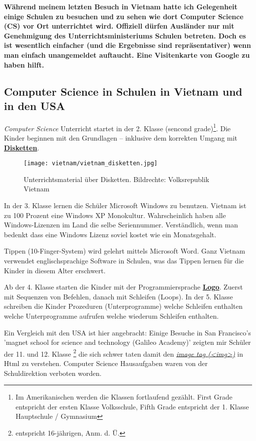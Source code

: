 \documentclass[10pt,a4paper,ngerman,twoside]{article} %
\begin{document}
\textbf{Während meinem letzten Besuch in Vietnam hatte ich Gelegenheit einige Schulen zu besuchen und zu sehen wie dort Computer Science (CS) vor Ort unterrichtet wird. Offiziell dürfen Ausländer nur mit Genehmigung des Unterrichtsministeriums Schulen betreten. Doch es ist wesentlich einfacher (und die Ergebnisse sind repräsentativer) wenn man einfach unangemeldet auftaucht. Eine Visitenkarte von Google zu haben hilft.}

\subsection*{Computer Science in Schulen in Vietnam und in den USA}


\textit{Computer Science} Unterricht startet in der 2. Klasse (sencond grade)\footnote{Im Amerikanischen werden die Klassen fortlaufend gez\"ahlt. First Grade entspricht der ersten Klasse Volksschule, Fifth Grade entspricht der 1. Klasse Hauptschule / Gymnasium}. Die Kinder beginnen mit den Grundlagen -- inklusive dem korrekten Umgang mit \href{http://de.wikipedia.org/wiki/Diskette}{\textbf{Disketten}}.
\begin{figure}
\texttt{[image: vietnam/vietnam\_disketten.jpg]}
\caption{Unterrichtsmaterial über Disketten. Bildrechte: Volksrepublik Vietnam}
\end{figure}
In der 3. Klasse lernen die Schüler Microsoft Windows zu benutzen. Vietnam ist zu 100 Prozent eine Windows XP Monokultur. Wahrscheinlich haben alle Windows-Lizenzen im Land die selbe Seriennummer. Verständlich, wenn man bedenkt dass eine Windows Lizenz soviel kostet wie ein Monatsgehalt.

Tippen (10-Finger-System) wird gelehrt mittels Microsoft Word. Ganz Vietnam verwendet englischsprachige Software in Schulen, was das Tippen lernen für die Kinder in diesem Alter erschwert.

Ab der 4. Klasse starten die Kinder mit der Programmiersprache \href{http://de.wikipedia.org/wiki/Logo_(Programmiersprache)}{\textbf{Logo}}. Zuerst mit Sequenzen von Befehlen, danach mit Schleifen (Loops). In der 5. Klasse schreiben die Kinder Prozeduren (Unterprogramme) welche Schleifen enthalten welche Unterprogramme aufrufen welche wiederum Schleifen enthalten.

Ein Vergleich mit den USA ist hier angebracht: Einige Besuche in San Francisco's 'magnet school for science and technology (Galileo Academy)' zeigten mir Schüler der 11. und 12. Klasse \footnote{entspricht 16-jährigen, Anm. d. Ü.} die sich schwer taten damit den \href{http://de.selfhtml.org/html/grafiken/einbinden.htm#referenz}{\textit{image tag (<img>)}} in Html zu verstehen. Computer Science Hausaufgaben waren von der Schuldirektion verboten worden.
\end{document}
